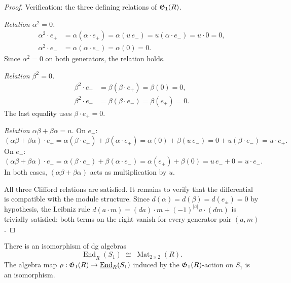 \begin{proof}
Verification: the three defining relations of $\mathfrak{G}_1(R)$.

\emph{Relation $\alpha^2 = 0$.}
\begin{align*}
\alpha^2 \cdot e_+ &= \alpha(\alpha \cdot e_+) = \alpha(u\,e_-)
= u(\alpha \cdot e_-) = u \cdot 0 = 0, \\
\alpha^2 \cdot e_- &= \alpha(\alpha \cdot e_-) = \alpha(0) = 0.
\end{align*}
Since $\alpha^2 = 0$ on both generators, the relation holds.

\emph{Relation $\beta^2 = 0$.}
\begin{align*}
\beta^2 \cdot e_+ &= \beta(\beta \cdot e_+) = \beta(0) = 0, \\
\beta^2 \cdot e_- &= \beta(\beta \cdot e_-) = \beta(e_+) = 0.
\end{align*}
The last equality uses $\beta \cdot e_+ = 0$.

\emph{Relation $\alpha\beta + \beta\alpha = u$.}
On $e_+$:
\[
(\alpha\beta + \beta\alpha) \cdot e_+
= \alpha(\beta \cdot e_+) + \beta(\alpha \cdot e_+)
= \alpha(0) + \beta(u\,e_-)
= 0 + u(\beta \cdot e_-)
= u \cdot e_+.
\]
On $e_-$:
\[
(\alpha\beta + \beta\alpha) \cdot e_-
= \alpha(\beta \cdot e_-) + \beta(\alpha \cdot e_-)
= \alpha(e_+) + \beta(0)
= u\,e_- + 0
= u \cdot e_-.
\]
In both cases, $(\alpha\beta + \beta\alpha)$ acts as
multiplication by $u$.

All three Clifford relations are satisfied.
It remains to verify that the differential is compatible with
the module structure. Since $d(\alpha) = d(\beta) = d(e_\pm) = 0$
by hypothesis, the Leibniz rule
$d(a \cdot m) = (da) \cdot m + (-1)^{|a|} a \cdot (dm)$
is trivially satisfied: both terms on the right vanish for
every generator pair $(a, m)$.
\end{proof}

\begin{proposition}
\label{prop:tholog-end-g1}
There is an isomorphism of dg algebras
\[
\underline{\operatorname{End}}_R(S_1)
\;\cong\;
\operatorname{Mat}_{2 \times 2}(R).
\]
The algebra map
$\rho : \mathfrak{G}_1(R) \to \underline{\operatorname{End}}_R(S_1)$
induced by the $\mathfrak{G}_1(R)$-action on $S_1$ is an isomorphism.
\end{proposition}

